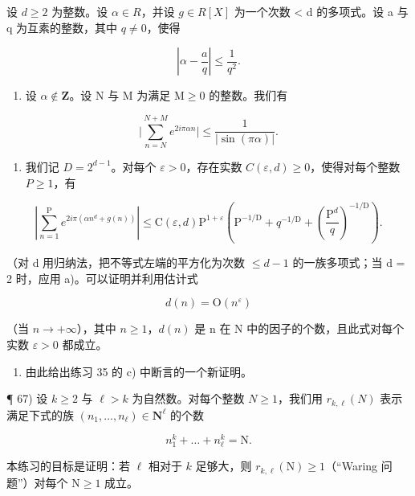 设 \(d \geqslant 2\) 为整数。设 \(\alpha \in R\)，并设 \(g \in R[X]\) 为一个次数 \textless{} d 的多项式。设 a 与 q 为互素的整数，其中 \(q \neq 0\)，使得

\[
\left| \alpha - \frac {a}{q} \right| \leqslant \frac {1}{q ^ {2}}.
\]

\begin{enumerate}
\def\labelenumi{\alph{enumi})}
\tightlist
\item
  设 \(\alpha \notin \mathbf{Z}\)。设 N 与 M 为满足 \(\mathrm{M} \geqslant 0\) 的整数。我们有
\end{enumerate}

\[
\Big | \sum_ {n = N} ^ {N + M} e ^ {2 i \pi \alpha n} \Big | \leqslant \frac {1}{| \sin (\pi \alpha) |}.
\]

\begin{enumerate}
\def\labelenumi{\alph{enumi})}
\setcounter{enumi}{1}
\tightlist
\item
  我们记 \(D = 2^{d-1}\)。对每个 \(\varepsilon > 0\)，存在实数 \(C(\varepsilon, d) \geqslant 0\)，使得对每个整数 \(P \geqslant 1\)，有
\end{enumerate}

\[
\left| \sum_ {n = 1} ^ {\mathrm{P}} e ^ {2 i \pi (\alpha n ^ {d} + g (n))} \right| \leqslant \mathrm{C} (\varepsilon , d) \mathrm{P} ^ {1 + \varepsilon} \left(\mathrm{P} ^ {- 1 / \mathrm{D}} + q ^ {- 1 / \mathrm{D}} + \left(\frac {\mathrm{P} ^ {d}}{q}\right) ^ {- 1 / \mathrm{D}}\right).
\]

（对 d 用归纳法，把不等式左端的平方化为次数 \(\leqslant d - 1\) 的一族多项式；当 d = 2 时，应用 a)。可以证明并利用估计式

\[
d (n) = \mathrm{O} (n ^ {\varepsilon})
\]

（当 \(n \to +\infty\)），其中 \(n \geqslant 1\)，\(d(n)\) 是 n 在 N 中的因子的个数，且此式对每个实数 \(\varepsilon > 0\) 都成立。

\begin{enumerate}
\def\labelenumi{\alph{enumi})}
\setcounter{enumi}{2}
\tightlist
\item
  由此给出练习 35 的 c) 中断言的一个新证明。
\end{enumerate}

¶ 67) 设 \(k \geqslant 2\) 与 \(\ell > k\) 为自然数。对每个整数 \(N \geqslant 1\)，我们用 \(r_{k,\ell}(N)\) 表示满足下式的族 \((n_1, \ldots, n_\ell) \in \mathbf{N}^\ell\) 的个数

\[
n _ {1} ^ {k} + \dots + n _ {\ell} ^ {k} = \mathrm{N}.
\]

本练习的目标是证明：若 \(\ell\) 相对于 \(k\) 足够大，则 \(r_{k,\ell}(\mathrm{N}) \geqslant 1\)（“Waring 问题”）对每个 \(\mathrm{N} \geqslant 1\) 成立。

